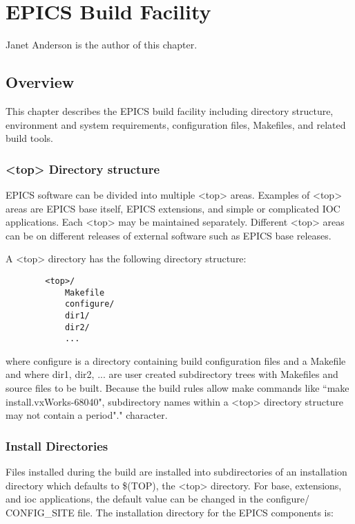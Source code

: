 \chapter{EPICS Build Facility}

Janet Anderson is the author of this chapter.

\section{Overview}

This chapter describes the EPICS build facility including directory structure, environment and system requirements, 
configuration files, Makefiles, and related build tools. 

\subsection{\textless{}top\textgreater{} Directory structure}

EPICS software can be divided into multiple \textless{}top\textgreater{} areas. Examples of \textless{}top\textgreater{} areas are EPICS base itself, EPICS 
extensions, and simple or complicated IOC applications. Each \textless{}top\textgreater{} may be maintained separately. Different \textless{}top\textgreater{} areas 
can be on different releases of external software such as EPICS base releases.

A \textless{}top\textgreater{} directory has the following directory structure:

\begin{verbatim}        <top>/
            Makefile
            configure/
            dir1/
            dir2/
            ...
\end{verbatim}where configure is a directory containing build configuration files and a Makefile and where dir1, dir2, ... are user created 
subdirectory trees with Makefiles and source files to be built. Because the build rules allow make commands like ``make 
install.vxWorks-68040", subdirectory names within a \textless{}top\textgreater{} directory structure may not contain a period"." character.

\subsection{Install Directories}

Files installed during the build are installed into subdirectories of an installation directory which defaults to \$(TOP), the 
\textless{}top\textgreater{} directory. For base, extensions, and ioc applications,  the default value can be changed in the configure/
CONFIG\_SITE file. The installation directory for the EPICS components is:


